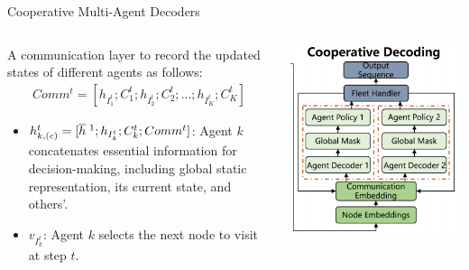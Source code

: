 \documentclass{beamer}
\begin{document}
\begin{frame}{Cooperative Multi-Agent Decoders}
	\begin{columns}
		\begin{column}{0.6\textwidth}
			\footnotesize
			A communication layer to record the updated states of different agents as follows:
			\begin{align}
				Comm^t=[h_{I_1^t};C_1^t;h_{I_2^t};C_2^t;...;h_{I_K^t};C_K^t]
			\end{align}
			\begin{itemize}
				\item $h_{k,(c)}^t=[\overline{h} \; \footnotemark ;h_{I_k^t};C_k^t;Comm^t]$: Agent $k$ concatenates essential information for decision-making, including global static representation, its current state, and others'.
				\item $v_{I_{k}^{t}}$: Agent $k$ selects the next node to visit at step $t$.
			\end{itemize}
		\end{column}
		\begin{column}{0.4\textwidth}
			\centering
			\includegraphics[width=\textwidth]{CD.png}
		\end{column}
	\end{columns}
\end{frame}
\end{document}
